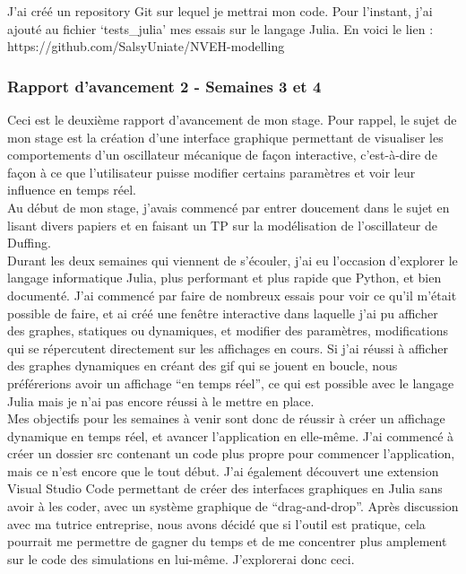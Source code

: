 \documentclass[a4paper, french, 12pt, titlepage]{article}
\begin{document}
J'ai créé un repository Git sur lequel je mettrai mon code. Pour l'instant, j'ai ajouté au fichier ‘tests\_julia' mes essais sur le langage Julia. En voici le lien : https://github.com/SalsyUniate/NVEH-modelling


\subsubsection*{Rapport d'avancement 2 - Semaines 3 et 4}

Ceci est le deuxième rapport d'avancement de mon stage. Pour rappel, le sujet de mon stage est la création d'une interface graphique permettant de visualiser les comportements d'un oscillateur mécanique de façon interactive, c'est-à-dire de façon à ce que l'utilisateur puisse modifier certains paramètres et voir leur influence en temps réel. \\

Au début de mon stage, j'avais commencé par entrer doucement dans le sujet en lisant divers papiers et en faisant un TP sur la modélisation de l'oscillateur de Duffing. \\

Durant les deux semaines qui viennent de s'écouler, j'ai eu l'occasion d'explorer le langage informatique Julia, plus performant et plus rapide que Python, et bien documenté. J'ai commencé par faire de nombreux essais pour voir ce qu'il m'était possible de faire, et ai créé une fenêtre interactive dans laquelle j'ai pu afficher des graphes, statiques ou dynamiques, et modifier des paramètres, modifications qui se répercutent directement sur les affichages en cours. Si j'ai réussi à afficher des graphes dynamiques en créant des gif qui se jouent en boucle, nous préférerions avoir un affichage “en temps réel”, ce qui est possible avec le langage Julia mais je n'ai pas encore réussi à le mettre en place. \\

Mes objectifs pour les semaines à venir sont donc de réussir à créer un affichage dynamique en temps réel, et avancer l'application en elle-même. J'ai commencé à créer un dossier src contenant un code plus propre pour commencer l'application, mais ce n'est encore que le tout début. J'ai également découvert une extension Visual Studio Code permettant de créer des interfaces graphiques en Julia sans avoir à les coder, avec un système graphique de “drag-and-drop”. Après discussion avec ma tutrice entreprise, nous avons décidé que si l'outil est pratique, cela pourrait me permettre de gagner du temps et de me concentrer plus amplement sur le code des simulations en lui-même. J'explorerai donc ceci. \\
\end{document}

